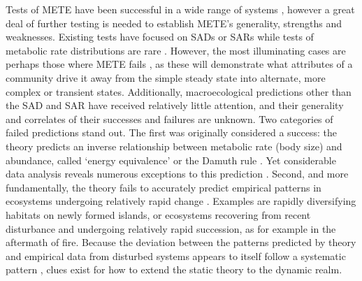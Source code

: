 Tests of METE have been successful in a wide range of systems
\citep{Harte:2008uf, Harte:2009it, Harte:2011ut, White:2012tn,
  newman2014}, however a great deal of further testing is needed to
establish METE's generality, strengths and weaknesses. Existing tests
have focused on SADs or SARs while tests of metabolic rate
distributions are rare \citep[but see][]{Harte:2011ut, newman2014,
  xiao2015}. However, the most illuminating cases are perhaps those
where METE fails \citep{Harte:2011ut}, as these will demonstrate what
attributes of a community drive it away from the simple steady state
into alternate, more complex or transient states. Additionally,
macroecological predictions other than the SAD and SAR have received
relatively little attention, and their generality and correlates of
their successes and failures are unknown. Two categories of failed
predictions stand out. The first was originally considered a success:
the theory predicts an inverse relationship between metabolic rate
(body size) and abundance, called `energy equivalence' or the Damuth
rule \citep{Damuth:1981un}. Yet considerable data analysis reveals
numerous exceptions to this prediction \citep{white2007}. Second, and
more fundamentally, the theory fails to accurately predict empirical
patterns in ecosystems undergoing relatively rapid change
\citep{Harte:2011ut, newman2014}. Examples are rapidly diversifying
habitats on newly formed islands, or ecosystems recovering from recent
disturbance and undergoing relatively rapid succession, as for example
in the aftermath of fire. Because the deviation between the patterns
predicted by theory and empirical data from disturbed systems appears
to itself follow a systematic pattern \citep[Rominger \textit{et al.}, in
prep.; ][]{newman2014}, clues exist for how to extend the static
theory to the dynamic realm.

